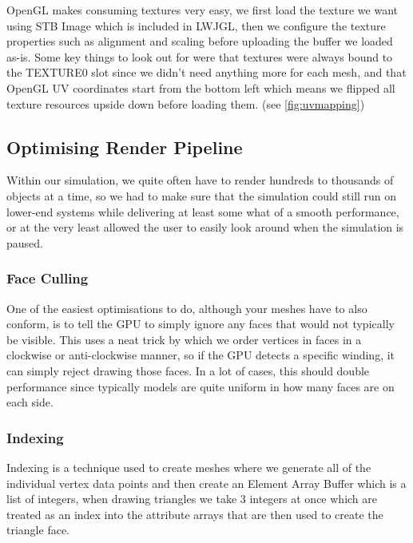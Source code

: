 \documentclass{article}
\begin{document}
\begin{multicols}{2}
                    OpenGL makes consuming textures very easy, we first load the texture we want using STB Image \cite{stb} which is included in LWJGL, then we configure the texture properties such as alignment and scaling before uploading the buffer we loaded as-is. Some key things to look out for were that textures were always bound to the TEXTURE0 slot since we didn’t need anything more for each mesh, and that OpenGL UV coordinates start from the bottom left which means we flipped all texture resources upside down before loading them. (see \autoref{fig:uvmapping})
            
            \subsection{Optimising Render Pipeline}

                Within our simulation, we quite often have to render hundreds to thousands of objects at a time, so we had to make sure that the simulation could still run on lower-end systems while delivering at least some what of a smooth performance, or at the very least allowed the user to easily look around when the simulation is paused.

                \subsubsection{Face Culling}

                    One of the easiest optimisations to do, although your meshes have to also conform, is to tell the GPU to simply ignore any faces that would not typically be visible. This uses a neat trick by which we order vertices in faces in a clockwise or anti-clockwise manner, so if the GPU detects a specific winding, it can simply reject drawing those faces. In a lot of cases, this should double performance since typically models are quite uniform in how many faces are on each side.

                \subsubsection{Indexing}

                    Indexing is a technique used to create meshes where we generate all of the individual vertex data points and then create an Element Array Buffer which is a list of integers, when drawing triangles we take 3 integers at once which are treated as an index into the attribute arrays that are then used to create the triangle face.


\end{multicols}
\end{document}
